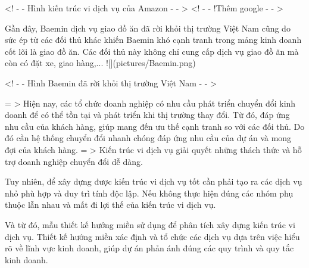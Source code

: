 <! - - Hình kiến trúc vi dịch vụ của Amazon - - >
<! - - !Thêm google - - >

Gần đây, Baemin dịch vụ giao đồ ăn đã rời khỏi thị trường Việt Nam cũng do sức ép từ các đối thủ khác khiến Baemin khó cạnh tranh trong mảng kinh doanh cốt lõi là giao đồ ăn. Các đối thủ này không chỉ cung cấp dịch vụ giao đồ ăn mà còn có đặt xe, giao hàng,...
![](pictures/Baemin.png)

<! - - Hình Baemin đã rời khỏi thị trường Việt Nam - - >

= > Hiện nay, các tổ chức doanh nghiệp có nhu cầu phát triển chuyển đổi kinh doanh để có thể tồn tại và phát triển khi thị trường thay đổi. Từ đó, đáp ứng nhu cầu của khách hàng, giúp mang đến ưu thế cạnh tranh so với các đối thủ. Do đó cần hệ thống chuyển đổi nhanh chóng đáp ứng nhu cầu của dự án và mong đợi của khách hàng.
= > Kiến trúc vi dịch vụ giải quyết những thách thức và hỗ trợ doanh nghiệp chuyển đổi dễ dàng.

Tuy nhiên, để xây dựng được kiến trúc vi dịch vụ tốt cần phải tạo ra các dịch vụ nhỏ phù hợp và duy trì tính độc lập. Nếu không thực hiện đúng các nhóm phụ thuộc lẫn nhau và mất đi lợi thế của kiến trúc vi dịch vụ.

Và từ đó, mẫu thiết kế hướng miền sử dụng để phân tích xây dựng kiến trúc vi dịch vụ.
Thiết kế hướng miền xác định và tổ chức các dịch vụ dựa trên việc hiểu rõ về lĩnh vực kinh doanh, giúp dự án phản ánh đúng các quy trình và quy tắc kinh doanh.
